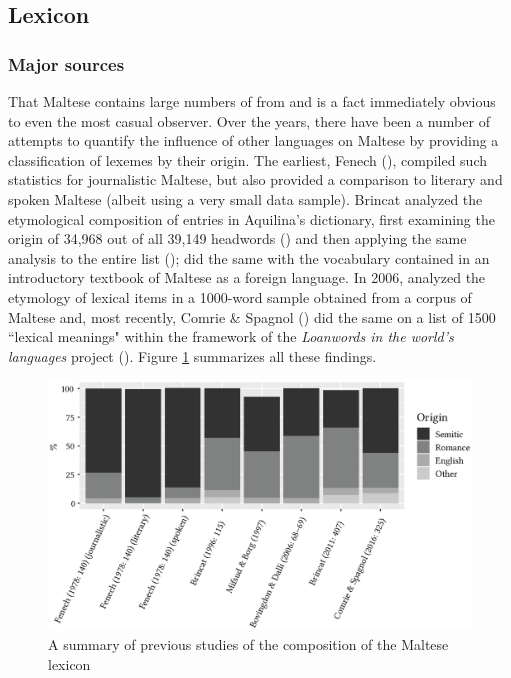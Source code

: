 \documentclass[output=paper]{langsci/langscibook}
\begin{document}


\subsection{Lexicon} \label{mtlexicon} %
\subsubsection{Major sources}
That Maltese contains large numbers of  from  and  is a fact immediately obvious to even the most casual observer. Over the years, there have been a number of attempts to quantify the influence of other languages on Maltese by providing a classification of lexemes by their origin. The earliest, Fenech (\citeyear[216--217]{fenech1978}), compiled such statistics for journalistic Maltese, but also provided a comparison to literary and spoken Maltese (albeit using a very small data sample). Brincat analyzed the etymological composition of entries in Aquilina's dictionary, first examining the origin of 34,968 out of all 39,149 headwords (\citealt[115]{brincat1996}) and then applying the same analysis to the entire list (\citealt[407]{brincat2011});  \cite{mifsudborg1997} did the same with the vocabulary contained in an introductory textbook of Maltese as a foreign language. In 2006, \cite{bovingdondalli2006} analyzed the etymology of lexical items in a 1000-word sample obtained from a corpus of Maltese and, most recently, Comrie \& Spagnol (\citeyear[318]{comriespagnol2016}) did the same on a list of 1500 ``lexical meanings" within the framework of the \textit{Loanwords in the world’s languages} project (\citealt{HaspelmathTadmor2009}). Figure \ref{lexiconfig} summarizes all these findings.
\begin{figure}[H]
\centering
\includegraphics[width=12cm]{figures/lexiconnewfont.eps}
\caption{A summary of previous studies of the composition of the Maltese lexicon}
\label{lexiconfig}
\end{figure}
\end{document}
